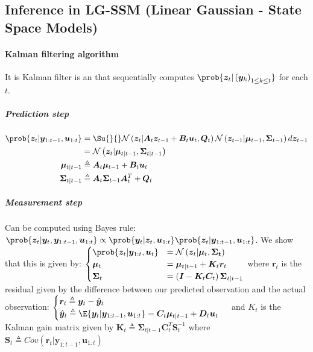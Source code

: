 \subsection{Inference in LG-SSM (Linear Gaussian - State Space Models)}
\paragraph{Kalman filtering algorithm}
It is Kalman filter is an  that sequentially computes $\prob{\bm{z}_{t}|\left(\bm{y}_{k}
\right)_{1\leq k\leq t}}$ for each $t$.

\subparagraph{Prediction step}
\begin{align*}
    \prob{\bm{z}_{t}|\bm{y}_{1:t-1},\bm{u}_{1:t}} &= \Su{}{}\mathcal{N}\left(\bm{z}_{t}|\bm{A}_{t}
    \bm{z}_{t-1}+\bm{B}_{t}\bm{u}_{t},\bm{Q}_{t}\right)\mathcal{N}\left(\bm{z}_{t-1}|\bm{\mu}_{t-1},
\bm{\Sigma}_{t-1}\right)d\bm{z}_{t-1}\\
                                                  &= \mathcal{N}\left(\bm{z}_{t}|\bm{\mu}_{t|t-1}
                                                  ,\bm{\Sigma}_{t|t-1}\right)\\
        \bm{\mu}_{t|t-1} &\triangleq \bm{A}_{t}\bm{\mu}_{t-1} + \bm{B}_{t}\bm{u}_{t}\\
        \bm{\Sigma}_{t|t-1} &\triangleq \bm{A}_{t}\bm{\Sigma}_{t-1}\bm{A}_{t}^{T} + \bm{Q}_{t}\\
\end{align*}

\subparagraph{Measurement step}
Can be computed using Bayes rule:\\
$\prob{\bm{z}_{t}|\bm{y}_{t},\bm{y}_{1:t-1},\bm{u}_{1:t}}\propto\prob{\bm{y}_{t}|\bm{z}_{t},\bm{u}_{
1:t}}\prob{\bm{z}_{t}|\bm{y}_{1:t-1},\bm{u}_{1:t}}$.
We show that this is given by:
$\begin{cases}
    \prob{\bm{z}_{t}|\bm{y}_{1:t},\bm{u}_{t}}  &= \mathcal{N}\left(\bm{z}_{t}|\bm{\mu}_{t},\bm{\Sigma
    _{t}}\right)\\
            \bm{\mu}_{t} &= \bm{\mu}_{t|t-1} + \bm{K}_{t}\bm{r}_{t}\\
            \bm{\Sigma}_{t} &= \left(\bm{I}-\bm{K}_{t}\bm{C}_{t}\right)\bm{\Sigma}_{t|t-1}
\end{cases}$
where $\bm{r}_{t}$ is the residual given by the difference between our predicted observation and the 
actual observation:
$\begin{cases}
    \bm{r}_{t}\triangleq \bm{y}_{t} - \hat{\bm{y}}_{t} \\
    \hat{\bm{y}}_{t} \triangleq \E{\bm{y}_{t}|\bm{y}_{1:t-1},\bm{u}_{1:t}} = \bm{C}_{t}\bm{\mu}_{
    t|t-1} + \bm{D}_{t}\bm{u}_{t}
\end{cases}$
and $K_{t}$ is the Kalman gain matrix given by $\bm{K}_{t}\triangleq \bm{\Sigma}_{t|t-1}\bm{C}^{T}_{
t}\bm{S}^{-1}_{t}$
where $\bm{S}_{t}\triangleq Cov(\bm{r}_{t}|\bm{y}_{1:t-1},\bm{u}_{1:t})$


